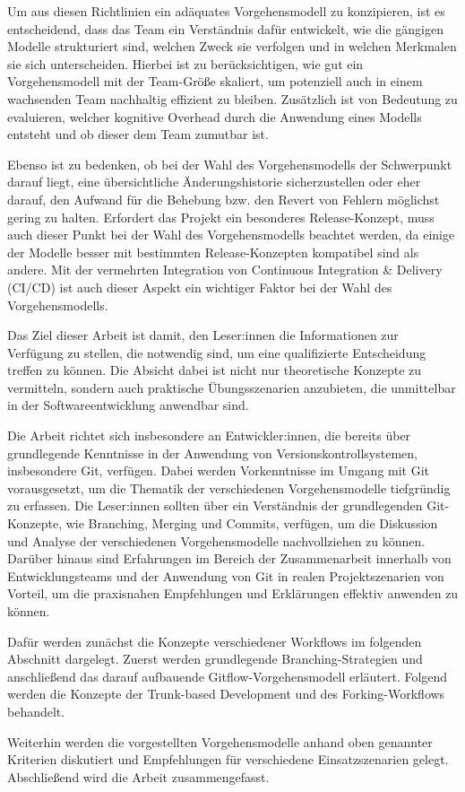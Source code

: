 Um aus diesen Richtlinien ein adäquates Vorgehensmodell zu konzipieren, ist es entscheidend, dass das Team ein Verständnis dafür entwickelt, wie die gängigen Modelle strukturiert sind, welchen Zweck sie verfolgen und in welchen Merkmalen sie sich unterscheiden. Hierbei ist zu berücksichtigen, wie gut ein Vorgehensmodell mit der Team\hyp Größe skaliert, um potenziell auch in einem wachsenden Team nachhaltig effizient zu bleiben. Zusätzlich ist von Bedeutung zu evaluieren, welcher kognitive Overhead durch die Anwendung eines Modells entsteht und ob dieser dem Team zumutbar ist.

Ebenso ist zu bedenken, ob bei der Wahl des Vorgehensmodells der Schwerpunkt darauf liegt, eine übersichtliche Änderungshistorie sicherzustellen oder eher darauf, den Aufwand für die Behebung bzw. den Revert von Fehlern möglichst gering zu halten. Erfordert das Projekt ein besonderes Release\hyp Konzept, muss auch dieser Punkt bei der Wahl des Vorgehensmodells beachtet werden, da einige der Modelle besser mit bestimmten Release\hyp Konzepten kompatibel sind als andere. Mit der vermehrten Integration von Continuous Integration \& Delivery (CI/CD) ist auch dieser Aspekt ein wichtiger Faktor bei der Wahl des Vorgehensmodells.

Das Ziel dieser Arbeit ist damit, den Leser:innen die Informationen zur Verfügung zu stellen, die notwendig sind, um eine qualifizierte Entscheidung treffen zu können. Die Absicht dabei ist nicht nur theoretische Konzepte zu vermitteln, sondern auch praktische Übungsszenarien anzubieten, die unmittelbar in der Softwareentwicklung anwendbar sind. 

Die Arbeit richtet sich insbesondere an Entwickler:innen, die bereits über grundlegende Kenntnisse in der Anwendung von Versionskontrollsystemen, insbesondere Git, verfügen. Dabei werden Vorkenntnisse im Umgang mit Git vorausgesetzt, um die Thematik der verschiedenen Vorgehensmodelle tiefgründig zu erfassen. Die Leser:innen sollten über ein Verständnis der grundlegenden Git\hyp Konzepte, wie Branching, Merging und Commits, verfügen, um die Diskussion und Analyse der verschiedenen Vorgehensmodelle nachvollziehen zu können. Darüber hinaus sind Erfahrungen im Bereich der Zusammenarbeit innerhalb von Entwicklungsteams und der Anwendung von Git in realen Projektszenarien von Vorteil, um die praxisnahen Empfehlungen und Erklärungen effektiv anwenden zu können.

Dafür werden zunächst die Konzepte verschiedener Workflows im folgenden Abschnitt dargelegt. Zuerst werden grundlegende Branching\hyp Strategien und anschließend das darauf aufbauende Gitflow\hyp Vorgehensmodell erläutert. Folgend werden die Konzepte der Trunk\hyp based Development und des Forking\hyp Workflows behandelt.

Weiterhin werden die vorgestellten Vorgehensmodelle anhand oben genannter Kriterien diskutiert und Empfehlungen für verschiedene Einsatzszenarien gelegt. Abschließend wird die Arbeit zusammengefasst.
